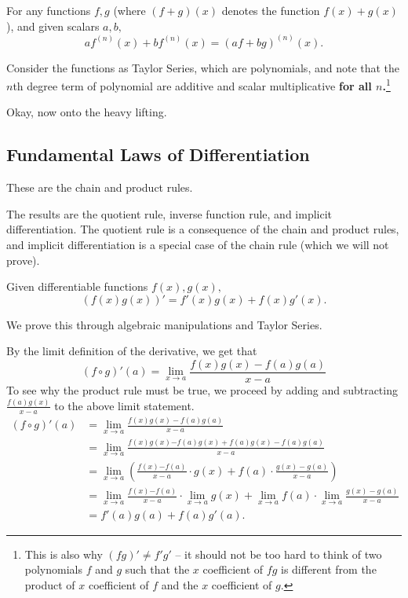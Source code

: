 \documentclass[blue,onecol]{shooting}
\begin{document}
\begin{theo}
For any functions $f,g$ (where $(f+g)(x)$ denotes the function $f(x)+g(x)$), and given scalars $a,b,$
\[af^{(n)}(x)+bf^{(n)}(x)=(af+bg)^{(n)}(x).\]
\end{theo}

\begin{pro}
Consider the functions as Taylor Series, which are polynomials, and note that the $n$th degree term of polynomial are additive and scalar multiplicative \textbf{for all $n$.}\footnote{This is also why $(fg)'\neq f'g'$ -- it should not be too hard to think of two polynomials $f$ and $g$ such that the $x$ coefficient of $fg$ is different from the product of $x$ coefficient of $f$ and the $x$ coefficient of $g.$}
\end{pro}

Okay, now onto the heavy lifting.

\subsection{Fundamental Laws of Differentiation}

These are the chain and product rules.

The results are the quotient rule, inverse function rule, and implicit differentiation. The quotient rule is a consequence of the chain and product rules, and implicit differentiation is a special case of the chain rule (which we will not prove).

\begin{theo}
Given differentiable functions $f(x),g(x),$
\[(f(x)g(x))'=f'(x)g(x)+f(x)g'(x).\]
\end{theo}

We prove this through algebraic manipulations and Taylor Series.

\begin{pro}[1 (Limit)]
By the limit definition of the derivative, we get that
\[(f\circ g)'(a) =\lim_{x\to a} \frac{f(x)g(x) -f(a)g(a)}{x-a}\]
To see why the product rule must be true, we proceed by adding and subtracting $\frac {f(a)g(x)}{x-a}$ to the above limit statement.  
\begin{equation}
\begin{split}
(f\circ g)'(a) &=\lim_{x\to a} \frac{f(x)g(x) -f(a)g(a)}{x-a}\\
&=\lim_{x\to a} \frac{f(x)g(x){-f(a)g(x)+f(a)g(x)}-f(a)g(a)}{x-a}\\
&=\lim_{x\to a} \left( \frac{f(x){-f(a)}}{x-a} \cdot g(x)
 +f(a) \cdot \frac{{g(x)}-g(a)}{x-a} \right)\\
&=\lim_{x\to a} \frac{f(x){-f(a)}}{x-a} \cdot \lim_{x\to a} g(x)
 +\lim_{x\to a} f(a) \cdot \lim_{x\to a} \frac{{g(x)}-g(a)}{x-a}\\
&= f'(a)g(a) +f(a)g'(a).
\end{split}
\nonumber
\end{equation}
\end{pro}
\end{document}
